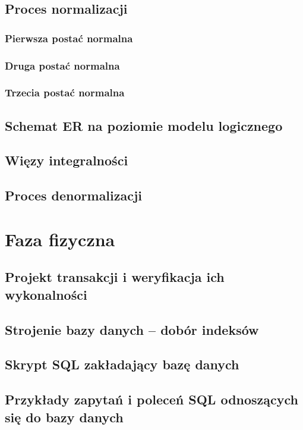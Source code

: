 \documentclass{mwrep}[15pt]
\begin{document}
\section{Proces normalizacji}

\subsection{Pierwsza postać normalna}
\subsection{Druga postać normalna}
\subsection{Trzecia postać normalna}


\section{Schemat ER na poziomie modelu logicznego}

\section{Więzy integralności}

\section{Proces denormalizacji}

\chapter{Faza fizyczna}

\section{Projekt transakcji i weryfikacja ich wykonalności}

\section{Strojenie bazy danych – dobór indeksów}

\section{Skrypt SQL zakładający bazę danych}

\section{Przykłady zapytań i poleceń SQL odnoszących się do bazy danych}
\end{document}
